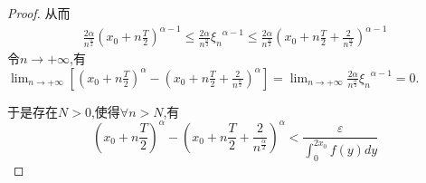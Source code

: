 \documentclass[lang=cn,newtx,10pt,scheme=chinese]{elegantbook}
\begin{document}
\begin{proof}
从而
\begin{equation}
  \begin{split}
    \frac{2\alpha}{n^{\frac{\alpha}{2}}}\left( x_0+n\frac{T}{2} \right) ^{\alpha -1}\leqslant \frac{2\alpha}{n^{\frac{\alpha}{2}}}{\xi _n}^{\alpha -1}\leqslant \frac{2\alpha}{n^{\frac{\alpha}{2}}}\left( x_0+n\frac{T}{2}+\frac{2}{n^{\frac{\alpha}{2}}} \right) ^{\alpha -1}
  \end{split}
  \nonumber
\end{equation}
令$n\rightarrow +\infty$,有$\lim_{n\rightarrow +\infty} \left[ \left( x_0+n\frac{T}{2} \right) ^{\alpha}-\left( x_0+n\frac{T}{2}+\frac{2}{n^{\frac{\alpha}{2}}} \right) ^{\alpha} \right] =\lim_{n\rightarrow +\infty} \frac{2\alpha}{n^{\frac{\alpha}{2}}}{\xi _n}^{\alpha -1}=0$.

于是存在$N>0$,使得$\forall n>N$,有
\begin{equation}\label{C}
  \left( x_0+n\frac{T}{2} \right) ^{\alpha}-\left( x_0+n\frac{T}{2}+\frac{2}{n^{\frac{\alpha}{2}}} \right) ^{\alpha}<\frac{\varepsilon}{\int_0^{2x_0}{f\left( y \right) dy}}
\end{equation}


\end{proof}
\end{document}
